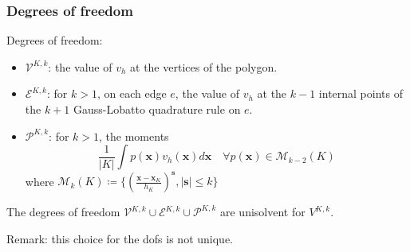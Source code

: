 \documentclass[10pt]{beamer}
\begin{document}
	\begin{frame} \frametitle{Degrees of freedom}
		Degrees of freedom:
		\begin{itemize}
			\item $\mathcal{V}^{K,k}$: the value of $v_h$ at the vertices of the polygon.
			\item $\mathcal{E}^{K,k} $: for $k>1$, on each edge $e$, the value of $v_h$ at the $k-1$ internal points of the $k+1$ Gauss-Lobatto quadrature rule on $e$.
			\item $\mathcal{P}^{K,k}$: for $k>1$, the moments
			$$\frac{1}{|K|} \int p(\mathbf{x})v_h(\mathbf{x})d\mathbf{x} \quad \forall p(\mathbf{x}) \in \mathcal{M}_{k-2}(K)$$
			where $\mathcal{M}_k(K) \coloneqq \bigg\lbrace \left( \frac{\mathbf{x}-\mathbf{x}_K}{h_K} \right)^\mathbf{s}, |\mathbf{s}|\leq k \bigg\rbrace$
		\end{itemize}
		\begin{theorem}
			The degrees of freedom $\mathcal{V}^{K,k} \cup \mathcal{E}^{K,k} \cup \mathcal{P}^{K,k}$ are unisolvent for $V^{K,k}$.
		\end{theorem}
		Remark: this choice for the dofs is not unique.
	\end{frame}
	

	
\end{document}

